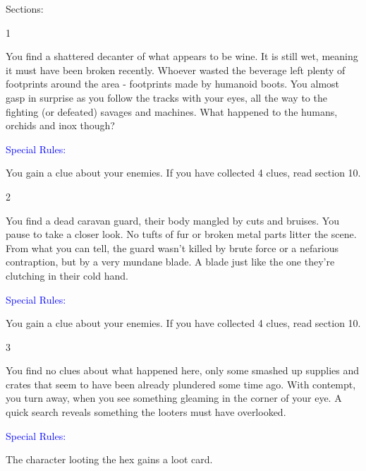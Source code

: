 \documentclass[fontsize=11pt]{scrartcl}
\begin{document}
	\begin{multicols}{3}
	  \begin{center}
	    {\myfont\textcolor{Sepia}{\LARGE{Sections:}}}
		\end{center}
		\begin{center}
		  {\myfont\large{\textcolor{Sepia}{1}}}
		\end{center}
		\footnotesize{You find a shattered decanter of what appears to be wine. It is still wet, meaning it must have been broken recently. Whoever wasted the beverage left plenty of footprints around the area - footprints made by humanoid boots. You almost gasp in surprise as you follow the tracks with your eyes, all the way to the fighting (or defeated) savages and machines. What happened to the humans, orchids and inox though?}
		\begin{center}
	    {\myfont\normalsize{\textcolor{Blue}{Special Rules:}}}
		\end{center}
		\footnotesize{You gain a clue about your enemies. If you have collected 4 clues, read section 10.}
		\begin{center}
		  {\myfont\large{\textcolor{Sepia}{2}}}
		\end{center}
		\footnotesize{You find a dead caravan guard, their body mangled by cuts and bruises. You pause to take a closer look. No tufts of fur or broken metal parts litter the scene. From what you can tell, the guard wasn’t killed by brute force or a nefarious contraption, but by a very mundane blade. A blade just like the one they’re clutching in their cold hand. }
		\begin{center}
	    {\myfont\normalsize{\textcolor{Blue}{Special Rules:}}}
		\end{center}
		\footnotesize{You gain a clue about your enemies. If you have collected 4 clues, read section 10.}
		\begin{center}
		  {\myfont\large{\textcolor{Sepia}{3}}}
		\end{center}
		\footnotesize{You find no clues about what happened here, only some smashed up supplies and crates that seem to have been already plundered some time ago. With contempt, you turn away, when you see something gleaming in the corner of your eye. A quick search reveals something the looters must have overlooked.}
		\begin{center}
	    {\myfont\normalsize{\textcolor{Blue}{Special Rules:}}}
		\end{center}
		\footnotesize{The character looting the hex gains a loot card.}
		\begin{center}

\end{center}
\end{multicols}
\end{document}
